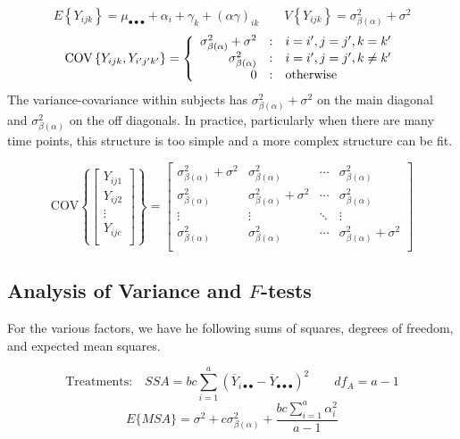 \documentclass[
]{book}
\begin{document}
\[
E\left\{Y_{ijk}\right\}=
\mu_{\bullet\bullet\bullet} + \alpha_i + \gamma_k + (\alpha\gamma)_{ik}
\qquad
V\left\{Y_{ijk}\right\}=\sigma_{\beta(\alpha)}^2+\sigma^2
\] \[
\mbox{COV}\left\{Y_{ijk},Y_{i'j'k'}\right\} = 
\left\{ \begin{array}{r@{\quad:\quad}l}
   \sigma_{\beta(\alpha)}^2 +  \sigma^2 & i=i',j=j',k=k' \\
    \sigma_{\beta(\alpha)}^2  & i=i', j=j',k\ne k' \\
    0 & \mbox{otherwise}\\
    \end{array} \right.
\] The variance-covariance within subjects has
\(\sigma_{\beta(\alpha)}^2 +  \sigma^2\) on the main diagonal and
\(\sigma_{\beta(\alpha)}^2\) on the off diagonals. In practice,
particularly when there are many time points, this structure is too
simple and a more complex structure can be fit.

\[
\mbox{COV}\left\{
\begin{bmatrix}
Y_{ij1} \\ Y_{ij2} \\ \vdots \\Y_{ijc} \\
\end{bmatrix}
\right\}
= 
\begin{bmatrix}
\sigma_{\beta(\alpha)}^2 +  \sigma^2 &
\sigma_{\beta(\alpha)}^2  &  \cdots &
\sigma_{\beta(\alpha)}^2 \\
\sigma_{\beta(\alpha)}^2 & 
\sigma_{\beta(\alpha)}^2 +  \sigma^2 &
\cdots & \sigma_{\beta(\alpha)}^2 \\
\vdots & \vdots & \ddots & \vdots \\
\sigma_{\beta(\alpha)}^2 & \sigma_{\beta(\alpha)}^2 & 
\cdots & \sigma_{\beta(\alpha)}^2 +  \sigma^2\\
\end{bmatrix}
\]

\subsection{\texorpdfstring{Analysis of Variance and
\(F\)-tests}{Analysis of Variance and F-tests}}\label{analysis-of-variance-and-f-tests}

For the various factors, we have he following sums of squares, degrees
of freedom, and expected mean squares.

\[
\mbox{Treatments:} \quad
SSA = bc\sum_{i=1}^a\left(\overline{Y}_{i\bullet\bullet}-
\overline{Y}_{\bullet\bullet\bullet}\right)^2 \qquad  df_A=a-1
\] \[
E\{MSA\}=\sigma^2 + c\sigma_{\beta(\alpha)}^2 + \frac{bc\sum_{i=1}^a\alpha_i^2}{a-1}
\]
\end{document}
